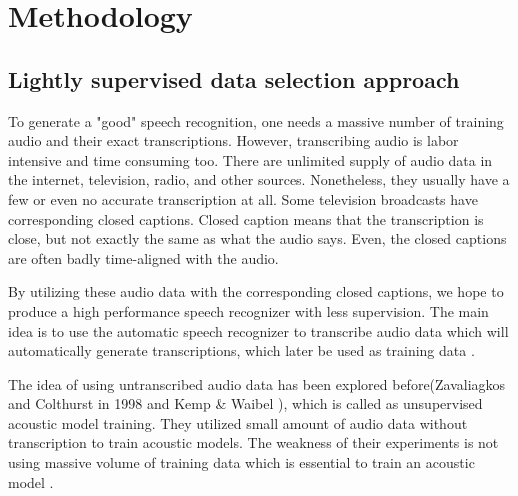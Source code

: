 \chapter{Methodology}


\section{Lightly supervised data selection approach}
\label{lsselection}
To generate a "good" speech recognition, one needs a massive number of training audio and their exact transcriptions. However, transcribing audio is labor intensive and time consuming too. There are unlimited supply of audio data in the internet, television, radio, and other sources. Nonetheless, they usually have a few or even no accurate transcription at all.  Some television broadcasts have corresponding closed captions.  Closed caption means that the transcription is close, but not exactly the same as what the audio says. Even, the closed captions are often badly time-aligned with the audio.

By utilizing these audio data with the corresponding closed captions, we hope to produce a high performance speech recognizer with less supervision. The main idea is to use the automatic speech recognizer to transcribe audio data which will automatically generate transcriptions, which later be used as training data \cite{lightlySupervised}. 

The idea of using untranscribed audio data has been explored before(Zavaliagkos and Colthurst in 1998 \cite{Zavaliagkos1998UtilizingUT} and Kemp \& Waibel \cite{Kemp_unsupervisedtraining}), which is called as unsupervised acoustic model training. They utilized small amount of audio data without transcription to train acoustic models. The weakness of their experiments is not using massive volume of training data which is essential to train an acoustic model \cite{lightlySupervised}.

